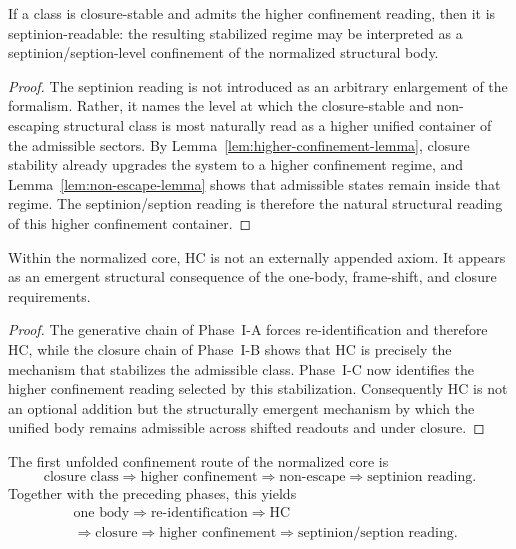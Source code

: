 \begin{theorem}
\label{thm:septinion-readability-theorem}
If a class is closure-stable and admits the higher confinement reading, then it
is septinion-readable: the resulting stabilized regime may be interpreted as a
septinion/seption-level confinement of the normalized structural body.
\end{theorem}

\begin{proof}
The septinion reading is not introduced as an arbitrary enlargement of the
formalism. Rather, it names the level at which the closure-stable and
non-escaping structural class is most naturally read as a higher unified
container of the admissible sectors. By Lemma~\ref{lem:higher-confinement-lemma},
closure stability already upgrades the system to a higher confinement regime,
and Lemma~\ref{lem:non-escape-lemma} shows that admissible states remain inside
that regime. The septinion/seption reading is therefore the natural structural
reading of this higher confinement container.
\end{proof}

\begin{corollary}
\label{cor:hc-emergent-structural-consequence}
Within the normalized core, HC is not an externally appended axiom. It appears
as an emergent structural consequence of the one-body, frame-shift, and closure
requirements.
\end{corollary}

\begin{proof}
The generative chain of Phase~I-A forces re-identification and therefore HC,
while the closure chain of Phase~I-B shows that HC is precisely the mechanism
that stabilizes the admissible class. Phase~I-C now identifies the higher
confinement reading selected by this stabilization. Consequently HC is not an
optional addition but the structurally emergent mechanism by which the unified
body remains admissible across shifted readouts and under closure.
\end{proof}

\begin{corollary}
\label{cor:first-confinement-forcing-chain}
The first unfolded confinement route of the normalized core is
\[
\text{closure class}
\Longrightarrow
\text{higher confinement}
\Longrightarrow
\text{non-escape}
\Longrightarrow
\text{septinion reading}.
\]
Together with the preceding phases, this yields
\[
\begin{aligned}
&\text{one body} \Longrightarrow \text{re-identification} \Longrightarrow \mathrm{HC}\\
&\Longrightarrow \text{closure} \Longrightarrow \text{higher confinement} \Longrightarrow \text{septinion/seption reading}.
\end{aligned}
\]
\end{corollary}

